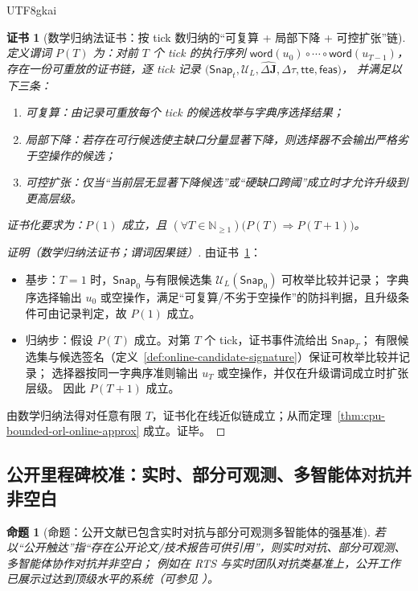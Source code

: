 \documentclass[12pt]{article}
\newtheorem{proposition}{命题}[section]
\newtheorem{Certificate}{证书}[section]
\newcommand{\NN}{\mathbb{N}}
\begin{document}
\begin{CJK*}{UTF8}{gkai}
\begin{Certificate}[数学归纳法证书：按 tick 数归纳的“可复算 + 局部下降 + 可控扩张”链]
\label{cert:cpu-bounded-orl-online-approx}
定义谓词 $P(T)$ 为：对前 $T$ 个 tick 的执行序列 $\mathsf{word}(u_0)\circ\cdots\circ\mathsf{word}(u_{T-1})$，
存在一份可重放的证书链，逐 tick 记录 $\bigl(\mathsf{Snap}_t,\mathcal{U}_L,\widehat{\Delta\mathbf{J}},\Delta\tau,\mathsf{tte},
  \mathsf{feas}\bigr)$，
并满足以下三条：
\begin{enumerate}
  \item 可复算：由记录可重放每个 tick 的候选枚举与字典序选择结果；
  \item 局部下降：若存在可行候选使主缺口分量显著下降，则选择器不会输出严格劣于空操作的候选；
  \item 可控扩张：仅当“当前层无显著下降候选”或“硬缺口跨阈”成立时才允许升级到更高层级。
\end{enumerate}
证书化要求为：$P(1)$ 成立，且 $(\forall T\in\NN_{\ge 1})\bigl(P(T)\Rightarrow P(T+1)\bigr)$。
\end{Certificate}

\begin{proof}[证明（数学归纳法证书；谓词因果链）]
由证书~\ref{cert:cpu-bounded-orl-online-approx}：
\begin{itemize}
  \item 基步：$T=1$ 时，$\mathsf{Snap}_0$ 与有限候选集 $\mathcal{U}_L(\mathsf{Snap}_0)$ 可枚举比较并记录；
  字典序选择输出 $u_0$ 或空操作，满足“可复算/不劣于空操作”的防抖判据，且升级条件可由记录判定，故 $P(1)$ 成立。
  \item 归纳步：假设 $P(T)$ 成立。对第 $T$ 个 tick，证书事件流给出 $\mathsf{Snap}_T$；
  有限候选集与候选签名（定义~\ref{def:online-candidate-signature}）保证可枚举比较并记录；
  选择器按同一字典序准则输出 $u_T$ 或空操作，并仅在升级谓词成立时扩张层级。
  因此 $P(T+1)$ 成立。
\end{itemize}
由数学归纳法得对任意有限 $T$，证书化在线近似链成立；从而定理~\ref{thm:cpu-bounded-orl-online-approx} 成立。证毕。
\end{proof}

\subsection{公开里程碑校准：实时、部分可观测、多智能体对抗并非空白}
\label{sec:calibration-public-realtime-pomdp-marl}

\begin{proposition}[命题：公开文献已包含实时对抗与部分可观测多智能体的强基准]
\label{prop:public-realtime-marl-exists}
若以“公开触达”指“存在公开论文/技术报告可供引用”，则实时对抗、部分可观测、多智能体协作对抗并非空白；
例如在 RTS 与实时团队对抗类基准上，公开工作已展示过达到顶级水平的系统（可参见 \cite{ref_pubmed_31666705,ref_openai_dota2}）。
\end{proposition}


\end{CJK*}
\end{document}
